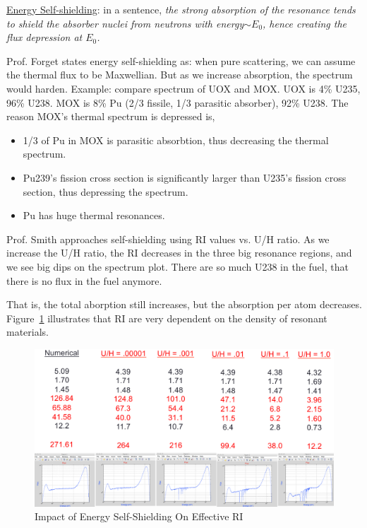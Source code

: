 \documentclass{school-22.211-notes}
\begin{document}
\uline{Energy Self-shielding}: in a sentence, \textit{the strong absorption of the resonance tends to shield the absorber nuclei from neutrons with energy$\sim E_0$, hence creating the flux depression at $E_0$.}

Prof. Forget states energy self-shielding as: when pure scattering, we can assume the thermal flux to be Maxwellian. But as we increase absorption, the spectrum would harden. Example: compare spectrum of UOX and MOX. UOX is 4\% U235, 96\% U238. MOX is 8\% Pu (2/3 fissile, 1/3 parasitic absorber), 92\% U238. The reason MOX's thermal spectrum is depressed is, 
\begin{itemize}
\item 1/3 of Pu in MOX is parasitic absorbtion, thus decreasing the thermal spectrum. 
\item Pu239's fission cross section is significantly larger than U235's fission cross section, thus depressing the spectrum.
\item Pu has huge thermal resonances. 
\end{itemize}
Prof. Smith approaches self-shielding using RI values vs. U/H ratio. As we increase the U/H ratio, the RI decreases in the three big resonance regions, and we see big dips on the spectrum plot. There are so much U238 in the fuel, that there is no flux in the fuel anymore. 

 That is, the total aborption still increases, but the absorption per atom decreases. Figure~\ref{energy-self-shielding} illustrates that RI are very dependent on the density of resonant materials.
\begin{figure}
  \centering
  \includegraphics[width=4.5in]{images/r-m/self-shielding.png}
  \caption{Impact of Energy Self-Shielding On Effective RI} \label{energy-self-shielding}
\end{figure}
\end{document}
